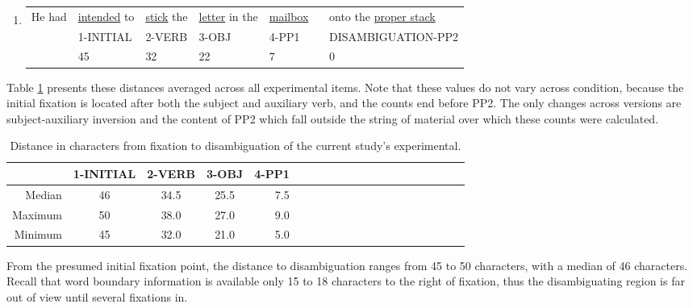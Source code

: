 \documentclass[11pt,oneside]{book}
\begin{document}
\begin{enumerate}
\def\labelenumi{(\arabic{enumi})}
\setcounter{enumi}{36}
\item
  \begingroup
    \setlength{\tabcolsep}{1pt}
    \begin{tabular}{lllll|l}
  He had & 
  \underline{intended} to & 
  \underline{stick} the & 
  \underline{letter} in the & 
  \underline{mailbox} \  & onto the \underline{proper stack} \\
  & \footnotesize 1-INITIAL & \footnotesize 2-VERB & \footnotesize 3-OBJ & \footnotesize 4-PP1 & \footnotesize DISAMBIGUATION-PP2 \\
  & 45 & 32 & 22 & 7 & 0
  \end{tabular}
  \endgroup
\end{enumerate}

Table \ref{tab:dtcs} presents these distances averaged across all experimental items. Note that these values do not vary across condition, because the initial fixation is located after both the subject and auxiliary verb, and the counts end before PP2. The only changes across versions are subject-auxiliary inversion and the content of PP2 which fall outside the string of material over which these counts were calculated.

\begin{table}[!h]

\caption{\label{tab:dtcs}Distance in characters from fixation to disambiguation of the current study's experimental.}
\centering
\begin{tabular}{rcccrcccrcccrcccrccc}
\toprule
  & 1-INITIAL & 2-VERB & 3-OBJ & 4-PP1\\
\midrule
Median & 46 & 34.5 & 25.5 & 7.5\\
Maximum & 50 & 38.0 & 27.0 & 9.0\\
Minimum & 45 & 32.0 & 21.0 & 5.0\\
\bottomrule
\end{tabular}
\end{table}

From the presumed initial fixation point, the distance to disambiguation ranges from 45 to 50 characters, with a median of 46 characters. Recall that word boundary information is available only 15 to 18 characters to the right of fixation, thus the disambiguating region is far out of view until several fixations in.
\end{document}
